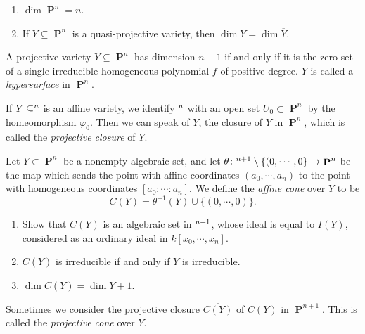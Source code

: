 \documentclass{hw_pset} %
\let\aa\relax
\DeclareMathOperator{\aa}{\mathbf{A}} %
\DeclareMathOperator{\pp}{\mathbf{P}} %
\begin{document}
\begin{solution}

\end{solution}

\begin{exercise}[2.7]
    \begin{enumerate}
        \item $\dim \pp^n = n$.
        \item If $Y \subseteq \pp^n$ is a quasi-projective variety, then $\dim Y =
          \dim \overline{Y}$.
    \end{enumerate}
\end{exercise}

\begin{solution}
    
\end{solution}

\begin{exercise}[2.8]
    A projective variety $Y \subseteq \pp^n$ has dimension $n-1$ if
    and only if it is the zero set of a single irreducible homogeneous polynomial
    $f$ of positive degree. $Y$ is called a \emph{hypersurface} in $\pp^n$.   
\end{exercise}

\begin{solution}
    
\end{solution}

\begin{exercise}[2.9]
    If $Y \subseteq \aa^n$ is an affine variety, we identify $\aa^n$ with an open
    set $U_0 \subset \pp^n$ by the homeomorphism $\varphi_0$. Then we can speak of
    $\overline{Y}$, the closure of $Y$ in $\pp^n$, which is called the
    \emph{projective closure} of $Y$. 
\end{exercise}

\begin{solution}
    
\end{solution}

\begin{exercise}[2.10]
    Let $Y \subset \pp^n$ be a nonempty algebraic set, and let $\theta\colon
    \aa^{n+1} \setminus \{(0,\cdots,0\} \to \pp^n$ be the map which sends the
    point with affine coordinates $(a_0, \cdots, a_n)$ to the point with
    homogeneous coordinates $[a_0 :\cdots: a_n]$. We define the \emph{affine cone}
    over $Y$ to be $$C(Y) = \theta^{-1}(Y) \cup \{(0,\cdots, 0)\}.$$ 
    \begin{enumerate}
        \item Show that $C(Y)$ is an algebraic set in $\aa^{n+1}$, whose ideal is equal to $I(Y)$, considered as an ordinary ideal in $k[x_0, \cdots, x_n]$. 
        \item $C(Y)$ is irreducible if and only if $Y$ is irreducible. 
        \item $\dim C(Y) = \dim Y +1$.
    \end{enumerate}
    Sometimes we consider the projective closure $\overline{C(Y)}$ of $C(Y)$ in
    $\pp^{n+1}$. This is called the \emph{projective cone} over $Y$.
\end{exercise}
\end{document}
